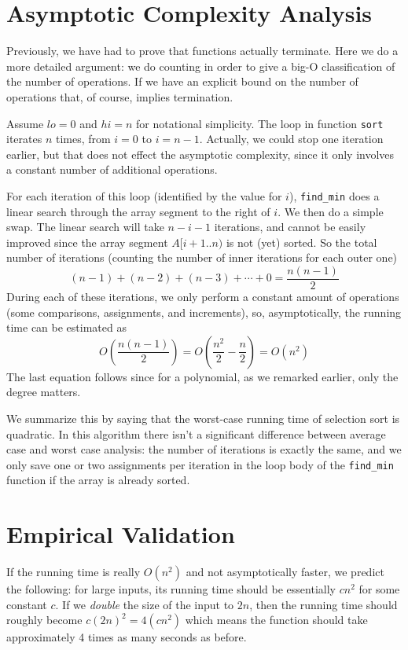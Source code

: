 \section{Asymptotic Complexity Analysis}
\label{sec:bigo:bigOanalysis}

Previously, we have had to prove that functions actually terminate.
Here we do a more detailed argument: we do counting in order to
give a big-O classification of the number of operations.  If we have
an explicit bound on the number of operations that, of course, implies
termination.

Assume \(\mathit{lo}=0\) and \(\mathit{hi}=n\) for notational
simplicity.  The loop in function \lstinline'sort' iterates $n$ times,
from $i = 0$ to $i = n-1$.  Actually, we could stop one iteration
earlier, but that does not effect the asymptotic complexity, since it
only involves a constant number of additional operations.

For each iteration of this loop (identified by the value for $i$),
\lstinline'find_min' does a linear search through the array segment to
the right of $i$.  We then do a simple swap.  The linear search will
take $n-i-1$ iterations, and cannot be easily improved since the array
segment $A\lbrack i+1{..}n)$ is not (yet) sorted.  So the total number of
iterations (counting the number of inner iterations for each outer
one)
$$
(n-1) + (n-2) + (n-3) + \cdots + 0 = \frac{n(n-1)}{2}
$$
During each of these iterations, we only perform a constant amount
of operations (some comparisons, assignments, and increments),
so, asymptotically, the running time can be estimated as
$$
O(\frac{n(n-1)}{2}) = O(\frac{n^2}{2} - \frac{n}{2}) = O(n^2)
$$
The last equation follows since for a polynomial, as we remarked
earlier, only the degree matters.

We summarize this by saying that the worst-case running time of
selection sort is quadratic.  In this algorithm there isn't a
significant difference between average case and worst case analysis:
the number of iterations is exactly the same, and we only save one or
two assignments per iteration in the loop body of the \lstinline'find_min'
function if the array is already sorted.

\clearpage
\section{Empirical Validation}
\label{sec:bigo:empirical}

If the running time is really $O(n^2)$ and not asymptotically
faster, we predict the following: for large inputs, its running time
should be essentially $c n^2$ for some constant $c$.  If we
\emph{double} the size of the input to $2n$, then the running time
should roughly become $c(2n)^2 = 4(c n^2)$ which means the function
should take approximately 4 times as many seconds as before.

